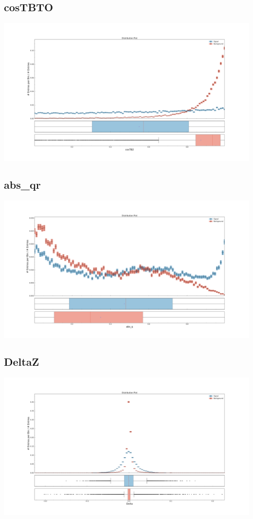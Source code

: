 \documentclass[10pt,a4paper]{article}
\begin{document}
\subsection{cosTBTO}
\begin{center}
\includegraphics[width=1.0\textwidth]{variable_-9014007897070616504.pdf}
\end{center}
\subsection{abs\_qr}
\begin{center}
\includegraphics[width=1.0\textwidth]{variable_-711010042978024191.pdf}
\end{center}
\subsection{DeltaZ}
\begin{center}
\includegraphics[width=1.0\textwidth]{variable_-8532270940665862889.pdf}
\end{center}
\end{document}

